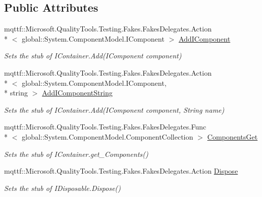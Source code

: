 \subsection*{Public Attributes}
\begin{DoxyCompactItemize}
\item 
mqttf\-::\-Microsoft.\-Quality\-Tools.\-Testing.\-Fakes.\-Fakes\-Delegates.\-Action\\*
$<$ global\-::\-System.\-Component\-Model.\-I\-Component $>$ \hyperlink{class_system_1_1_component_model_1_1_fakes_1_1_stub_i_nested_container_ad0eff77c53001d2d637fd154b12b66e8}{Add\-I\-Component}
\begin{DoxyCompactList}\small\item\em Sets the stub of I\-Container.\-Add(\-I\-Component component)\end{DoxyCompactList}\item 
mqttf\-::\-Microsoft.\-Quality\-Tools.\-Testing.\-Fakes.\-Fakes\-Delegates.\-Action\\*
$<$ global\-::\-System.\-Component\-Model.\-I\-Component, \\*
string $>$ \hyperlink{class_system_1_1_component_model_1_1_fakes_1_1_stub_i_nested_container_a276c61c6e1b9ea759f43daaefcc9c452}{Add\-I\-Component\-String}
\begin{DoxyCompactList}\small\item\em Sets the stub of I\-Container.\-Add(\-I\-Component component, String name)\end{DoxyCompactList}\item 
mqttf\-::\-Microsoft.\-Quality\-Tools.\-Testing.\-Fakes.\-Fakes\-Delegates.\-Func\\*
$<$ global\-::\-System.\-Component\-Model.\-Component\-Collection $>$ \hyperlink{class_system_1_1_component_model_1_1_fakes_1_1_stub_i_nested_container_a81e54304602186a1e6c293301e813ddd}{Components\-Get}
\begin{DoxyCompactList}\small\item\em Sets the stub of I\-Container.\-get\-\_\-\-Components()\end{DoxyCompactList}\item 
mqttf\-::\-Microsoft.\-Quality\-Tools.\-Testing.\-Fakes.\-Fakes\-Delegates.\-Action \hyperlink{class_system_1_1_component_model_1_1_fakes_1_1_stub_i_nested_container_aa1f07ddc3eb590e01a970c4f9cdb1095}{Dispose}
\begin{DoxyCompactList}\small\item\em Sets the stub of I\-Disposable.\-Dispose()\end{DoxyCompactList}\item 

\end{DoxyCompactItemize}
